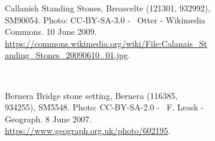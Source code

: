 \begin{figure}
  \centering
  \begin{subfigure}[t]{.48\textwidth}
    \caption*{Callanish Standing Stones, Breascelte (121301, 932992), SM90054. Photo: CC-BY-SA-3.0 - \textcopyright~Otter - Wikimedia Commons. 10 June 2009. \url{https://commons.wikimedia.org/wiki/File:Calanais_Standing_Stones_20090610_01.jpg}.}
  \end{subfigure}
  ~
  \begin{subfigure}[t]{.48\textwidth}
    \caption*{Bernera Bridge stone setting, Bernera (116385, 934255), SM5548. Photo: CC-BY-SA-2.0 - \textcopyright~F. Leask - Geograph. 8 June 2007. \url{https://www.geograph.org.uk/photo/602195}.}
  \end{subfigure}
  \\[.5cm]
  \begin{subfigure}[t]{.48\textwidth}

\end{subfigure}
\end{figure}
